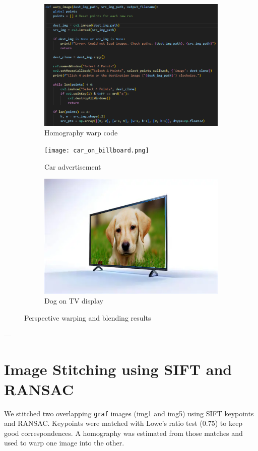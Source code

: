 \documentclass[12pt,a4paper]{article}
\begin{document}
\begin{figure}[H]\centering
\begin{subfigure}{0.31\textwidth}
\includegraphics[width=\linewidth]{images/q3_code.png}
\caption{Homography warp code}
\end{subfigure}
\begin{subfigure}{0.31\textwidth}
\texttt{[image: car\_on\_billboard.png]}
\caption{Car advertisement}
\end{subfigure}
\begin{subfigure}{0.31\textwidth}
\includegraphics[width=\linewidth]{dog_on_tv.png}
\caption{Dog on TV display}
\end{subfigure}
\caption{Perspective warping and blending results}
\end{figure}

---

\section{Image Stitching using SIFT and RANSAC}
We stitched two overlapping \texttt{graf} images (img1 and img5) using SIFT keypoints and RANSAC. Keypoints were matched with Lowe's ratio test (0.75) to keep good correspondences. A homography was estimated from those matches and used to warp one image into the other.
\end{document}
